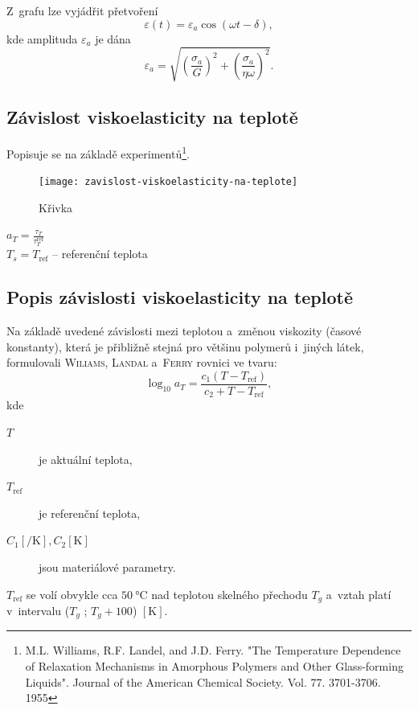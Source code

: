Z~grafu lze vyjádřit přetvoření
\begin{equation}
	\varepsilon(t) = \varepsilon_a \cos(\omega t - \delta),
\end{equation}
kde amplituda $\varepsilon_a$ je dána
\begin{equation}
	\varepsilon_a = \sqrt{\left(\frac{\sigma_a}{G}\right)^2 + \left(\frac{\sigma_a}{\eta \omega}\right)^2}.
\end{equation}

\subsection{Závislost viskoelasticity na teplotě}
Popisuje se na základě experimentů\footnote{M.L. Williams, R.F. Landel, and J.D. Ferry. "The Temperature Dependence of Relaxation Mechanisms in Amorphous Polymers and Other Glass-forming Liquids". Journal of the American Chemical Society. Vol. 77. 3701-3706. 1955}.

\begin{figure}[H]
	\centering
	\caption{Křivka}
	\label{fig:zavislost-viskoelasticity-na-teplote}
	\texttt{[image: zavislost-viskoelasticity-na-teplote]}
\end{figure}

$a_T = \frac{\tau_T}{\tau_T^\text{ref}}$\\
$T_s = T_\text{ref}$ -- referenční teplota

\subsection{Popis závislosti viskoelasticity na teplotě}
Na základě uvedené závislosti mezi teplotou a~změnou viskozity (časové konstanty), která je přibližně stejná pro většinu polymerů i~jiných látek, formulovali \textsc{Wiliams}, \textsc{Landal} a~\textsc{Ferry} rovnici ve tvaru:
\begin{equation}\label{eq:williams-landal-ferry}
	\log_{10} a_T = 	\frac{c_1 (T - T_\text{ref})}{c_2 + T - T_\text{ref}},
\end{equation}
kde
\begin{description}
	\item[$T$] je aktuální teplota,
	\item[$T_\text{ref}$] je referenční teplota,
	\item[{$C_1 [\si{\per\kelvin}], C_2 [\si{\kelvin}]$}] jsou materiálové parametry.
\end{description}

$T_\text{ref}$ se volí obvykle cca $\SI{50}{\celsius}$ nad teplotou skelného přechodu $T_g$ a~vztah platí v~intervalu ($T_g$ ; $T_g +100$) $[\si{\kelvin}]$.

